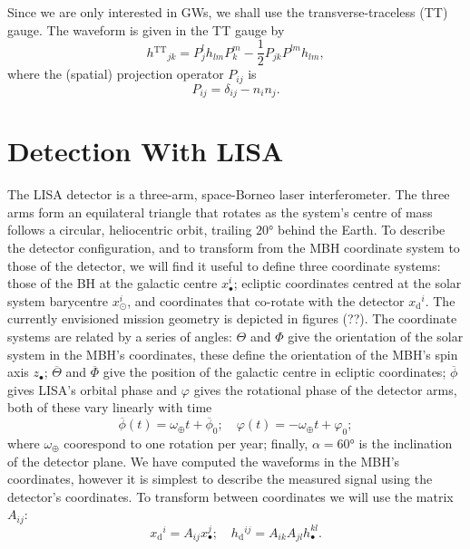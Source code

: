 \documentclass[a4paper, 11pt, titlepage, twoside]{report}
\newcommand{\sub}[1]{\ensuremath{_\mathrm{#1}}}
\newcommand{\super}[1]{\ensuremath{^\mathrm{#1}}}
\newcommand{\recip}[1]{\ensuremath{\frac{1}{#1}}}
\begin{document}
Since we are only interested in GWs, we shall use the transverse-traceless (TT) gauge. The waveform is given in the TT gauge by\cite{Misner1973}
\begin{equation}
{h\super{TT}}_{jk} = P^l_jh_{lm}P^m_k - \recip{2}P_{jk}P^{lm}h_{lm},
\end{equation}
where the (spatial) projection operator $P_{ij}$ is
\begin{equation}
P_{ij} = \delta_{ij} - n_in_j.
\end{equation}

\section{Detection With LISA}

The LISA detector is a three-arm, space-Borneo laser interferometer\cite{Bender1998, Danzmann2003}. The three arms form an equilateral triangle that rotates as the system's centre of mass follows a circular, heliocentric orbit, trailing $\ang{20}$ behind the Earth. To describe the detector configuration, and to transform from the MBH coordinate system to those of the detector, we will find it useful to define three coordinate systems: those of the BH at the galactic centre $x_\bullet^i$; ecliptic coordinates centred at the solar system barycentre $x_\odot^i$, and coordinates that co-rotate with the detector $x\sub{d}^i$. The currently envisioned mission geometry is depicted in figures (??). The coordinate systems are related by a series of angles: $\Theta$ and $\Phi$ give the orientation of the solar system in the MBH's coordinates, these define the orientation of the MBH's spin axis $z_\bullet$; $\overline{\Theta}$ and $\overline{\Phi}$ give the position of the galactic centre in ecliptic coordinates; $\overline{\phi}$ gives LISA's orbital phase and $\varphi$ gives the rotational phase of the detector arms, both of these vary linearly with time
\begin{equation}
\overline{\phi}(t) = \omega_\oplus t + \overline{\phi}_0; \quad \varphi(t) = -\omega_\oplus t + \varphi_0;
\end{equation}
where $\omega_\oplus$ coorespond to one rotation per year; finally, $\alpha = \ang{60}$ is the inclination of the detector plane. We have computed the waveforms in the MBH's coordinates, however it is simplest to describe the measured signal using the detector's coordinates. To transform between coordinates we will use the matrix $A_{ij}$:
\begin{equation}
x\sub{d}^i = A_{ij}x_\bullet^j; \quad h\sub{d}^{ij} = A_{ik}A_{jl}h_\bullet^{kl}.
\end{equation}
\end{document}
